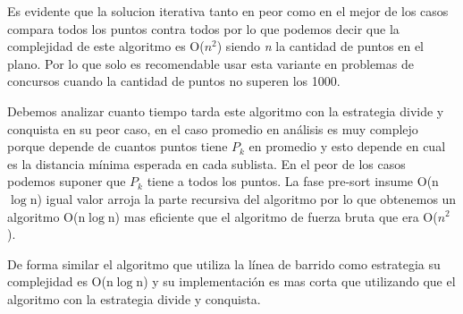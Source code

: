 Es evidente que la solucion iterativa tanto en peor como en el mejor de los casos compara todos los puntos contra todos por lo que podemos decir que la complejidad de este algoritmo es O($n^{2}$) siendo {\em n} la cantidad de puntos en el plano. Por lo que solo es recomendable usar esta variante en problemas de concursos cuando la cantidad de puntos no superen los 1000.

Debemos analizar cuanto tiempo tarda este algoritmo con la estrategia divide y conquista en su peor caso, en el caso promedio en análisis es muy complejo porque depende de cuantos puntos tiene $P_{k}$ en promedio y esto depende en cual es la distancia mínima esperada en cada sublista. En el peor de los casos podemos suponer que $P_{k}$ tiene a todos los puntos. La fase pre-sort insume O(n$\log$n) igual valor arroja la parte recursiva del algoritmo por lo que obtenemos un algoritmo O(n$\log$n) mas eficiente que el algoritmo de fuerza bruta que era O($n^{2}$).

De forma similar el algoritmo que utiliza la línea de barrido como estrategia su complejidad es O(n$\log$n) y su implementación es mas corta que utilizando que el algoritmo con la estrategia divide y conquista.